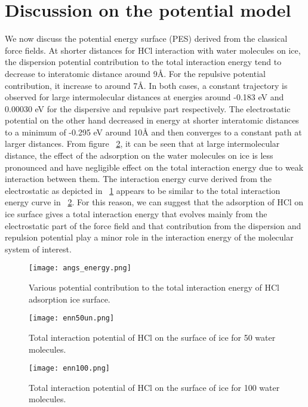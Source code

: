 \documentclass[a4paper,11pt]{report}
\begin{document}
\section{Discussion on the potential model}
We now discuss the potential energy surface (PES) derived from the classical force fields. At shorter distances for HCl interaction with water molecules on ice, the dispersion potential contribution to the total interaction energy tend to decrease to interatomic distance around 9{{\AA}}. For the repulsive potential contribution, it increase to around 7{{\AA}}. In both cases, a constant trajectory is observed for large intermolecular distances at energies around -0.183 eV and 0.00030 eV for the dispersive and repulsive part respectively. The electrostatic potential on the other hand decreased in energy at shorter interatomic distances to a minimum of -0.295 eV around 10{{\AA}} and then converges to a constant path at larger distances. From figure ~\ref{figure12}, it can be seen that at large intermolecular distance, the effect of the adsorption on the water molecules on ice is less pronounced and have negligible effect on the total interaction energy due to weak interaction between them. The interaction energy curve derived from the electrostatic as depicted in ~\ref{figure6} appears to be similar to the total interaction energy curve in ~\ref{figure12}. For this reason, we can suggest that the adsorption of HCl on ice surface gives a total interaction energy that evolves mainly from the electrostatic part of the force field and that contribution from the dispersion and repulsion potential play a minor role in the interaction energy of the molecular system of interest.

\begin{figure}[H]\large
\texttt{[image: angs\_energy.png]}
\caption{Various potential contribution to the total interaction energy of HCl adsorption ice surface.}
\label{figure6}
\end{figure}

\begin{figure}[H]\large
\texttt{[image: enn50un.png]}
\caption{Total interaction potential of HCl on the surface of ice for 50 water molecules.}
\label{figure12}
\end{figure}

\begin{figure}[H]\large
\texttt{[image: enn100.png]}
\caption{Total interaction potential of HCl on the surface of ice for 100 water molecules.}
\label{figure101}
\end{figure}
\end{document}
